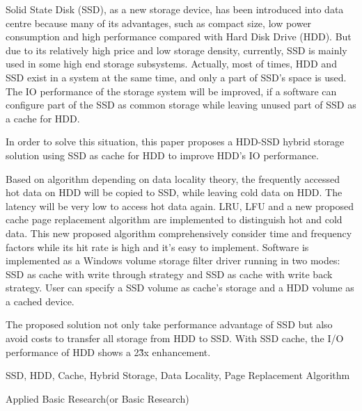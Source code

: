 \begin{eabstract}

Solid State Disk (SSD), as a new storage device, has been introduced into data centre because many of its advantages, such as compact size, low power consumption and high performance compared with Hard Disk Drive (HDD). But due to its relatively high price and low storage density, currently, SSD is mainly used in some high end storage subsystems. Actually, most of times, HDD and SSD exist in a system at the same time, and only a part of SSD's space is used. The IO performance of the storage system will be improved, if a software can configure part of the SSD as common storage while leaving unused part of SSD as a cache for HDD.

In order to solve this situation, this paper proposes a HDD-SSD hybrid storage solution using SSD as cache for HDD to improve HDD's IO performance.

Based on algorithm depending on data locality theory, the frequently accessed hot data on HDD will be copied to SSD, while leaving cold data on HDD. The latency will be very low to access hot data again. LRU, LFU and a new proposed cache page replacement algorithm are implemented to distinguish hot and cold data. This new proposed algorithm comprehensively consider time and frequency factors while its hit rate is high and it's easy to implement. Software is implemented as a Windows volume storage filter driver running in two modes: SSD as cache with write through strategy and SSD as cache with write back strategy. User can specify a SSD volume as cache's storage and a HDD volume as a cached device.

The proposed solution not only take performance advantage of SSD but also avoid costs to transfer all storage from HDD to SSD. With SSD cache, the I/O performance of HDD shows a 2\~3x enhancement.

\end{eabstract}

\begin{ekeywords}
SSD, HDD, Cache, Hybrid Storage, Data Locality, Page Replacement Algorithm
\end{ekeywords}

\begin{ethesistype}
Applied Basic Research(or Basic Research)
\end{ethesistype}


